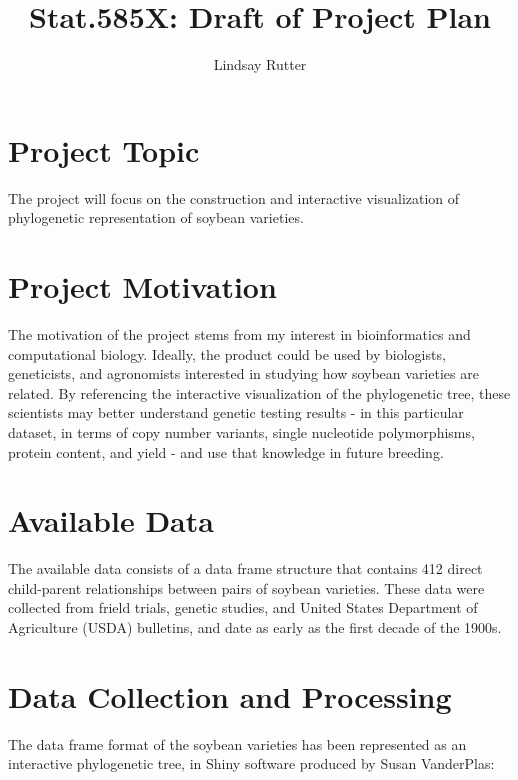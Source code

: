 \documentclass{article}\usepackage[]{graphicx}\usepackage[]{color}
\begin{document}
\author{Lindsay Rutter}
\title{Stat.585X: Draft of Project Plan}

\maketitle




\section*{Project Topic}

The project will focus on the construction and interactive visualization of phylogenetic representation of soybean varieties.

\section*{Project Motivation}

The motivation of the project stems from my interest in bioinformatics and computational biology. Ideally, the product could be used by biologists, geneticists, and agronomists interested in studying how soybean varieties are related. By referencing the interactive visualization of the phylogenetic tree, these scientists may better understand genetic testing results - in this particular dataset, in terms of copy number variants, single nucleotide polymorphisms, protein content, and yield - and use that knowledge in future breeding.

\section*{Available Data}

The available data consists of a data frame structure that contains 412 direct child-parent relationships between pairs of soybean varieties. These data were collected from frield trials, genetic studies, and United States Department of Agriculture (USDA) bulletins, and date as early as the first decade of the 1900s.

\section*{Data Collection and Processing}

The data frame format of the soybean varieties has been represented as an interactive phylogenetic tree, in Shiny software produced by Susan VanderPlas:\\
\end{document}
